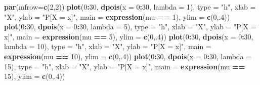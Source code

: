 \documentclass[10pt,a4paper]{book}
\newenvironment{Shaded}{\begin{snugshade}}{\end{snugshade}}
\newcommand{\KeywordTok}[1]{\textcolor[rgb]{0.13,0.29,0.53}{\textbf{#1}}}
\newcommand{\DataTypeTok}[1]{\textcolor[rgb]{0.13,0.29,0.53}{#1}}
\newcommand{\DecValTok}[1]{\textcolor[rgb]{0.00,0.00,0.81}{#1}}
\newcommand{\StringTok}[1]{\textcolor[rgb]{0.31,0.60,0.02}{#1}}
\newcommand{\OperatorTok}[1]{\textcolor[rgb]{0.81,0.36,0.00}{\textbf{#1}}}
\newcommand{\NormalTok}[1]{#1}
\begin{document}
\begin{Shaded}
\begin{Highlighting}[]
\KeywordTok{par}\NormalTok{(}\DataTypeTok{mfrow=}\KeywordTok{c}\NormalTok{(}\DecValTok{2}\NormalTok{,}\DecValTok{2}\NormalTok{))}
\KeywordTok{plot}\NormalTok{(}\DecValTok{0}\OperatorTok{:}\DecValTok{30}\NormalTok{, }\KeywordTok{dpois}\NormalTok{(}\DataTypeTok{x =} \DecValTok{0}\OperatorTok{:}\DecValTok{30}\NormalTok{, }\DataTypeTok{lambda =} \DecValTok{1}\NormalTok{), }\DataTypeTok{type =} \StringTok{"h"}\NormalTok{,}
     \DataTypeTok{xlab =} \StringTok{"X"}\NormalTok{, }\DataTypeTok{ylab =} \StringTok{"P[X = x]"}\NormalTok{, }\DataTypeTok{main =} \KeywordTok{expression}\NormalTok{(mu }\OperatorTok{==}\StringTok{ }\DecValTok{1}\NormalTok{),}
     \DataTypeTok{ylim =} \KeywordTok{c}\NormalTok{(}\DecValTok{0}\NormalTok{,.}\DecValTok{4}\NormalTok{))}
\KeywordTok{plot}\NormalTok{(}\DecValTok{0}\OperatorTok{:}\DecValTok{30}\NormalTok{, }\KeywordTok{dpois}\NormalTok{(}\DataTypeTok{x =} \DecValTok{0}\OperatorTok{:}\DecValTok{30}\NormalTok{, }\DataTypeTok{lambda =} \DecValTok{5}\NormalTok{), }\DataTypeTok{type =} \StringTok{"h"}\NormalTok{,}
     \DataTypeTok{xlab =} \StringTok{"X"}\NormalTok{, }\DataTypeTok{ylab =} \StringTok{"P[X = x]"}\NormalTok{, }\DataTypeTok{main =} \KeywordTok{expression}\NormalTok{(mu }\OperatorTok{==}\StringTok{ }\DecValTok{5}\NormalTok{),}
     \DataTypeTok{ylim =} \KeywordTok{c}\NormalTok{(}\DecValTok{0}\NormalTok{,.}\DecValTok{4}\NormalTok{))}
\KeywordTok{plot}\NormalTok{(}\DecValTok{0}\OperatorTok{:}\DecValTok{30}\NormalTok{, }\KeywordTok{dpois}\NormalTok{(}\DataTypeTok{x =} \DecValTok{0}\OperatorTok{:}\DecValTok{30}\NormalTok{, }\DataTypeTok{lambda =} \DecValTok{10}\NormalTok{), }\DataTypeTok{type =} \StringTok{"h"}\NormalTok{,}
     \DataTypeTok{xlab =} \StringTok{"X"}\NormalTok{, }\DataTypeTok{ylab =} \StringTok{"P[X = x]"}\NormalTok{, }\DataTypeTok{main =} \KeywordTok{expression}\NormalTok{(mu }\OperatorTok{==}\StringTok{ }\DecValTok{10}\NormalTok{),}
     \DataTypeTok{ylim =} \KeywordTok{c}\NormalTok{(}\DecValTok{0}\NormalTok{,.}\DecValTok{4}\NormalTok{))}
\KeywordTok{plot}\NormalTok{(}\DecValTok{0}\OperatorTok{:}\DecValTok{30}\NormalTok{, }\KeywordTok{dpois}\NormalTok{(}\DataTypeTok{x =} \DecValTok{0}\OperatorTok{:}\DecValTok{30}\NormalTok{, }\DataTypeTok{lambda =} \DecValTok{15}\NormalTok{), }\DataTypeTok{type =} \StringTok{"h"}\NormalTok{,}
     \DataTypeTok{xlab =} \StringTok{"X"}\NormalTok{, }\DataTypeTok{ylab =} \StringTok{"P[X = x]"}\NormalTok{, }\DataTypeTok{main =} \KeywordTok{expression}\NormalTok{(mu }\OperatorTok{==}\StringTok{ }\DecValTok{15}\NormalTok{),}
     \DataTypeTok{ylim =} \KeywordTok{c}\NormalTok{(}\DecValTok{0}\NormalTok{,.}\DecValTok{4}\NormalTok{))}
\end{Highlighting}
\end{Shaded}
\end{document}
